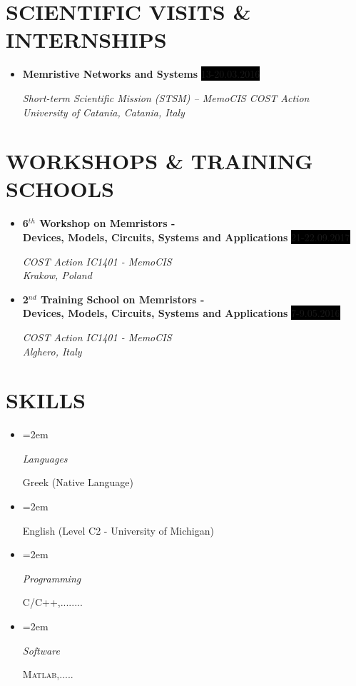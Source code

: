 \documentclass[paper=a4,fontsize=11pt]{scrartcl} %
\newlength{\spacebox}
\newcommand{\sepspace}{\vspace*{1em}}		%
\newcommand{\NewPart}[1]{\section*{\uppercase{#1}}}
\newcommand{\PersonalEntry}[2]{
		\noindent\hangindent=2em\hangafter=0 %
		\parbox{\spacebox}{        %
		\textit{#1}}		       %
		\hspace{1.5em} #2 \par}    %
\newcommand{\SkillsEntry}[2]{      %
		\noindent\hangindent=2em\hangafter=0 %
		\parbox{2\spacebox}{        %
		\textit{#1}}			   %
		\hspace{1.5em} #2 \par}    %
\newcommand{\MiscEntry}[2]{
		\noindent \textbf{#1} \par      %
		\noindent \textit{#2} \par              %
		\normalsize \par}
\newcommand{\MiscEntryDate}[3]{
		\noindent \textbf{#1} \hfill      %
		\colorbox{Black}{\color{White}#2} \par  %
		\noindent \textit{#3} \par              %
		\normalsize \par}
\begin{document}
\NewPart{Scientific Visits \& Internships}

\begin{itemize}[leftmargin=*]
    \item \MiscEntryDate{Memristive Networks and Systems}{\footnotesize 13-20.03.2016}{Short-term Scientific Mission (STSM) – MemoCIS COST Action\\University of Catania, Catania, Italy}
\end{itemize}
\sepspace

\NewPart{Workshops \& Training Schools}

\begin{itemize}[leftmargin=*]
    \item \MiscEntryDate{6$^{th}$ Workshop on Memristors - \\Devices, Models, Circuits, Systems and Applications}{\footnotesize 21-22.09.2017}{COST Action IC1401 - MemoCIS \\Krakow, Poland}
    \item \MiscEntryDate{2$^{nd}$ Training School on Memristors - \\Devices, Models, Circuits, Systems and Applications}{\footnotesize 7-9.05.2016}{COST Action IC1401 - MemoCIS \\Alghero, Italy}
\end{itemize}
\sepspace





\NewPart{Skills}

\begin{itemize}
    \item[] \SkillsEntry{Languages}{Greek (Native Language)}
    \item[] \SkillsEntry{}{English (Level C2 - University of Michigan)}
    \item[] \SkillsEntry{Programming}{\textsc{C/C++},........}
    \item[] \SkillsEntry{Software}{\textsc{Matlab},.....}
\end{itemize}
\sepspace
\end{document}
